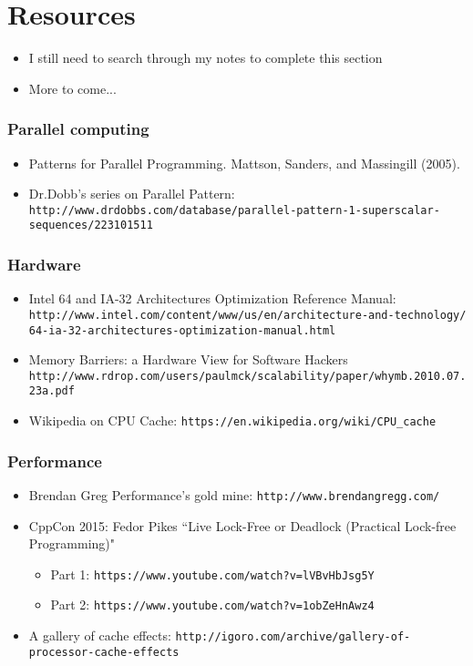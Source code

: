 \section{Resources}
\label{sec:res}

\begin{frame}
  \begin{itemize}
  \item I still need to search through my notes to complete this section
  \item More to come...
  \end{itemize}
\end{frame}

\begin{frame}[fragile]
  \frametitle{Parallel computing}

  \begin{itemize}
  \item Patterns for Parallel Programming. Mattson, Sanders, and Massingill (2005).
    \item Dr.Dobb's series on Parallel Pattern: \tiny\verb+http://www.drdobbs.com/database/parallel-pattern-1-superscalar-sequences/223101511+
  \end{itemize}
\end{frame}

\begin{frame}[fragile]
  \frametitle{Hardware}

  \begin{itemize}
  \item Intel 64 and IA-32 Architectures Optimization Reference Manual: \tiny\verb+http://www.intel.com/content/www/us/en/architecture-and-technology/+
    \tiny\verb+64-ia-32-architectures-optimization-manual.html+
  \item \small Memory Barriers: a Hardware View for Software Hackers
    \tiny\verb+http://www.rdrop.com/users/paulmck/scalability/paper/whymb.2010.07.23a.pdf+
  \item \small Wikipedia on CPU Cache: \verb+https://en.wikipedia.org/wiki/CPU_cache+
  \end{itemize}
\end{frame}

\begin{frame}[fragile]
  \frametitle{Performance}

  \begin{itemize}
  \item Brendan Greg Performance's gold mine: \verb+http://www.brendangregg.com/+
  \item CppCon 2015: Fedor Pikes “Live Lock-Free or Deadlock (Practical Lock-free Programming)"
    \begin{itemize}
    \item Part 1: \verb+https://www.youtube.com/watch?v=lVBvHbJsg5Y+
    \item Part 2: \verb+https://www.youtube.com/watch?v=1obZeHnAwz4+
    \end{itemize}
  \item A gallery of cache effects: \footnotesize\verb+http://igoro.com/archive/gallery-of-processor-cache-effects+
  \end{itemize}
\end{frame}

